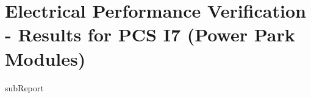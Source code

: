 \renewcommand{\DTRPcs}{I7PPM} %
\renewcommand{\DTRPcsLong}{I7 (Power Park Modules)}


    \section{Electrical Performance Verification - Results for PCS \DTRPcsLong}

    {{subReport}}
    \newpage

